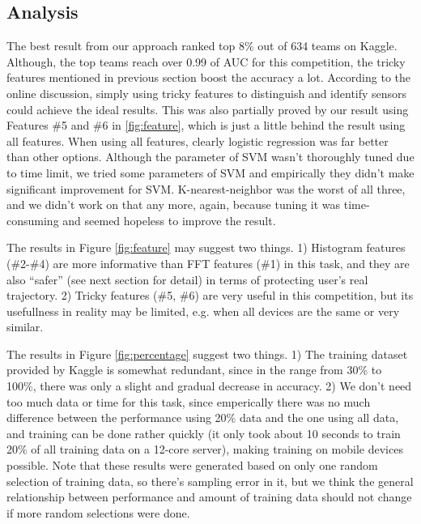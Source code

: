 \documentclass{article} %
\begin{document}

\subsection{Analysis} %
\label{sub:analysis}


The best result from our approach ranked top 8\% out of 634 teams on Kaggle. Although, the top teams reach over 0.99 of AUC for this competition, the tricky features mentioned in previous section boost the accuracy a lot. According to the online discussion, simply using tricky features to distinguish and identify sensors could achieve the ideal results. This was also partially proved by our result using Features \#5 and \#6 in \ref{fig:feature}, which is just a little behind the result using all features. When using all features, clearly logistic regression was far better than other options. Although the parameter of SVM wasn't thoroughly tuned due to time limit, we tried some parameters of SVM and empirically they didn't make significant improvement for SVM. K-nearest-neighbor was the worst of all three, and we didn't work on that any more, again, because tuning it was time-consuming and seemed hopeless to improve the result.

The results in Figure \ref{fig:feature} may suggest two things. 1) Histogram features (\#2-\#4) are more informative than FFT features (\#1) in this task, and they are also ``safer'' (see next section for detail) in terms of protecting user's real trajectory. 2) Tricky features (\#5, \#6) are very useful in this competition, but its usefullness in reality may be limited, e.g. when all devices are the same or very similar.


The results in Figure \ref{fig:percentage} suggest two things. 1) The training dataset provided by Kaggle is somewhat redundant, since in the range from 30\% to 100\%, there was only a slight and gradual decrease in accuracy. 2) We don't need too much data or time for this task, since emperically there was no much difference between the performance using 20\% data and the one using all data, and training can be done rather quickly (it only took about 10 seconds to train 20\% of all training data on a 12-core server), making training on mobile devices possible. Note that these results were generated based on only one random selection of training data, so there's sampling error in it, but we think the general relationship between performance and amount of training data should not change if more random selections were done.
\end{document}
